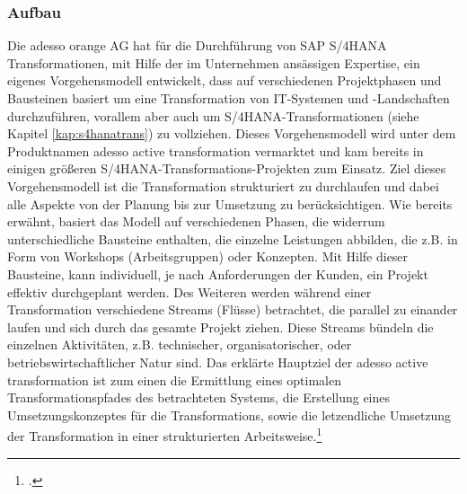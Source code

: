 \subsubsection{Aufbau}
Die adesso orange AG hat für die Durchführung von SAP S/4HANA Transformationen, mit Hilfe der im Unternehmen ansässigen Expertise, ein eigenes Vorgehensmodell entwickelt, dass auf verschiedenen Projektphasen und Bausteinen basiert um eine Transformation von IT-Systemen und -Landschaften durchzuführen, vorallem aber auch um S/4HANA-Transformationen (siehe Kapitel \ref{kap:s4hanatrans}) zu vollziehen. Dieses Vorgehensmodell wird unter dem Produktnamen \glqq{}adesso active transformation\grqq{} vermarktet und kam bereits in einigen größeren S/4HANA-Transformations-Projekten zum Einsatz. Ziel dieses Vorgehensmodell ist die Transformation strukturiert zu durchlaufen und dabei alle Aspekte von der Planung bis zur Umsetzung zu berücksichtigen. Wie bereits erwähnt, basiert das Modell auf verschiedenen Phasen, die widerrum unterschiedliche Bausteine enthalten, die einzelne Leistungen abbilden, die z.B. in Form von Workshops (Arbeitsgruppen) oder Konzepten. Mit Hilfe dieser Bausteine, kann individuell, je nach Anforderungen der Kunden, ein Projekt effektiv durchgeplant werden. Des Weiteren werden während einer Transformation verschiedene \glqq{}Streams\grqq{} (Flüsse) betrachtet, die parallel zu einander laufen und sich durch das gesamte Projekt ziehen. Diese Streams bündeln die einzelnen Aktivitäten, z.B. technischer, organisatorischer, oder betriebswirtschaftlicher Natur sind. Das erklärte Hauptziel der \glqq{}adesso active transformation\grqq{} ist zum einen die Ermittlung eines optimalen Transformationspfades des betrachteten Systems, die Erstellung eines Umsetzungskonzeptes für die Transformations, sowie die letzendliche Umsetzung der Transformation in einer strukturierten Arbeitsweise.\footcite[Vgl.][]{aat-vorgehensmodell}

